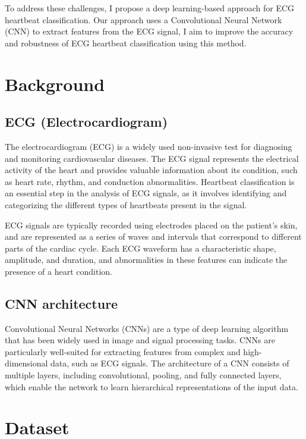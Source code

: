 \documentclass[14pt]{extreport}
\begin{document}
To address these challenges, I propose a deep learning-based approach for ECG heartbeat classification. Our approach uses a Convolutional Neural Network (CNN) to extract features from the ECG signal, I aim to improve the accuracy and robustness of ECG heartbeat classification using this method.

\chapter{Background}

\section{ECG (Electrocardiogram)}

The electrocardiogram (ECG) is a widely used non-invasive test for diagnosing and monitoring cardiovascular diseases. The ECG signal represents the electrical activity of the heart and provides valuable information about its condition, such as heart rate, rhythm, and conduction abnormalities. Heartbeat classification is an essential step in the analysis of ECG signals, as it involves identifying and categorizing the different types of heartbeats present in the signal.

ECG signals are typically recorded using electrodes placed on the patient's skin, and are represented as a series of waves and intervals that correspond to different parts of the cardiac cycle. Each ECG waveform has a characteristic shape, amplitude, and duration, and abnormalities in these features can indicate the presence of a heart condition.

\section{CNN architecture}

Convolutional Neural Networks (CNNs) are a type of deep learning algorithm that has been widely used in image and signal processing tasks. CNNs are particularly well-suited for extracting features from complex and high-dimensional data, such as ECG signals. The architecture of a CNN consists of multiple layers, including convolutional, pooling, and fully connected layers, which enable the network to learn hierarchical representations of the input data.

\chapter{Dataset}
\end{document}
